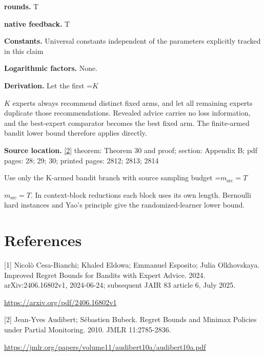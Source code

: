 \documentclass[10pt,a4paper]{article}
\newcommand{\AtlasMath}[1]{\par\begingroup\centering\setbox0=\hbox{$\displaystyle #1$}\ifdim\wd0>1.4\linewidth\typeout{ATLAS WIDE FORMULA: \the\wd0}\fi\ifdim\wd0>\linewidth\resizebox{\linewidth}{!}{\box0}\else\box0\fi\par\endgroup}
\newcommand{\AtlasInlineMath}[1]{\begingroup\setbox0=\hbox{$#1$}\ifdim\wd0>.4\linewidth\endgroup\AtlasMath{#1}\else\endgroup$#1$\fi}
\begin{document}
\textbf{rounds.} T

\textbf{native feedback.} T

\textbf{Constants.} Universal constants independent of the parameters explicitly tracked in this claim

\textbf{Logarithmic factors.} None.

\textbf{Derivation.} Let the first \AtlasInlineMath{K} experts always recommend distinct fixed arms, and let all remaining experts duplicate those recommendations. Revealed advice carries no loss information, and the best-expert comparator becomes the best fixed arm. The finite-armed bandit lower bound therefore applies directly.

\textbf{Source location.} \href{https://jmlr.org/papers/volume11/audibert10a/audibert10a.pdf}{[2]} theorem: Theorem 30 and proof; section: Appendix B; pdf pages: 28; 29; 30; printed pages: 2812; 2813; 2814

Use only the K-armed bandit branch with source sampling budget \AtlasInlineMath{m_{\mathrm{src}}=T}. In context-block reductions each block uses its own length. Bernoulli hard instances and Yao's principle give the randomized-learner lower bound.

\section{References}
[1] Nicolò Cesa-Bianchi; Khaled Eldowa; Emmanuel Esposito; Julia Olkhovskaya. Improved Regret Bounds for Bandits with Expert Advice. 2024. arXiv:2406.16802v1, 2024-06-24; subsequent JAIR 83 article 6, July 2025.

\url{https://arxiv.org/pdf/2406.16802v1}

[2] Jean-Yves Audibert; Sébastien Bubeck. Regret Bounds and Minimax Policies under Partial Monitoring. 2010. JMLR 11:2785-2836.

\url{https://jmlr.org/papers/volume11/audibert10a/audibert10a.pdf}
\end{document}
